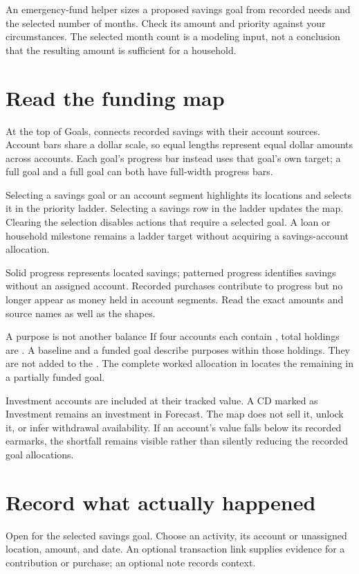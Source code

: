 An emergency-fund helper sizes a proposed savings goal from recorded needs and the selected number of months. Check its amount and priority against your circumstances. The selected month count is a modeling input, not a conclusion that the resulting amount is sufficient for a household.

\section{Read the funding map}
At the top of Goals,  connects recorded savings with their account sources. Account bars share a dollar scale, so equal lengths represent equal dollar amounts across accounts. Each goal's progress bar instead uses that goal's own target; a full  goal and a full  goal can both have full-width progress bars.

Selecting a savings goal or an account segment highlights its locations and selects it in the priority ladder. Selecting a savings row in the ladder updates the map. Clearing the selection disables actions that require a selected goal. A loan or household milestone remains a ladder target without acquiring a savings-account allocation.

Solid progress represents located savings; patterned progress identifies savings without an assigned account. Recorded purchases contribute to progress but no longer appear as money held in account segments. Read the exact amounts and source names as well as the shapes.

\begin{notebox}{A purpose is not another balance}
If four accounts each contain , total holdings are . A  baseline and a  funded goal describe purposes within those holdings. They are not added to the . The complete worked allocation in  locates the remaining  in a partially funded goal.
\end{notebox}

Investment accounts are included at their tracked value. A CD marked as Investment remains an investment in Forecast. The map does not sell it, unlock it, or infer withdrawal availability. If an account's value falls below its recorded earmarks, the shortfall remains visible rather than silently reducing the recorded goal allocations.

\section{Record what actually happened}
Open  for the selected savings goal. Choose an activity, its account or unassigned location, amount, and date. An optional transaction link supplies evidence for a contribution or purchase; an optional note records context.

